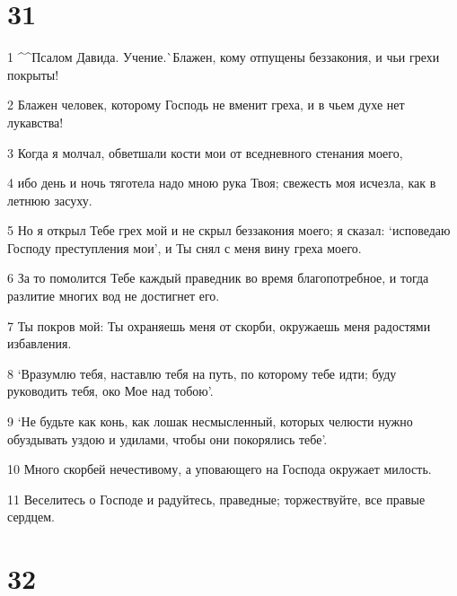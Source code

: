 \chapter{31}

\par 1 ^^Псалом Давида. Учение.^^ Блажен, кому отпущены беззакония, и чьи грехи покрыты!
\par 2 Блажен человек, которому Господь не вменит греха, и в чьем духе нет лукавства!
\par 3 Когда я молчал, обветшали кости мои от вседневного стенания моего,
\par 4 ибо день и ночь тяготела надо мною рука Твоя; свежесть моя исчезла, как в летнюю засуху.
\par 5 Но я открыл Тебе грех мой и не скрыл беззакония моего; я сказал: `исповедаю Господу преступления мои', и Ты снял с меня вину греха моего.
\par 6 За то помолится Тебе каждый праведник во время благопотребное, и тогда разлитие многих вод не достигнет его.
\par 7 Ты покров мой: Ты охраняешь меня от скорби, окружаешь меня радостями избавления.
\par 8 `Вразумлю тебя, наставлю тебя на путь, по которому тебе идти; буду руководить тебя, око Мое над тобою'.
\par 9 `Не будьте как конь, как лошак несмысленный, которых челюсти нужно обуздывать уздою и удилами, чтобы они покорялись тебе'.
\par 10 Много скорбей нечестивому, а уповающего на Господа окружает милость.
\par 11 Веселитесь о Господе и радуйтесь, праведные; торжествуйте, все правые сердцем.

\chapter{32}

